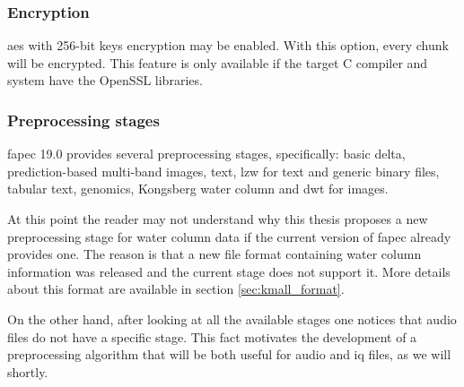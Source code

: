 \subsubsection{Encryption}
\acrshort{aes} with 256-bit keys encryption may be enabled. With this option, every chunk will be encrypted. This feature is only available if the target C compiler and system have the OpenSSL libraries.

\subsubsection{Preprocessing stages}
\acrshort{fapec} 19.0 provides several preprocessing stages, specifically: basic delta, prediction-based multi-band images, text, \acrshort{lzw} for text and generic binary files, tabular text, genomics, Kongsberg water column and \acrshort{dwt} for images.

At this point the reader may not understand why this thesis proposes a new preprocessing stage for water column data if the current version of \acrshort{fapec} already provides one. The reason is that a new file format containing water column information was released and the current stage does not support it. More details about this format are available in section \ref{sec:kmall_format}.

On the other hand, after looking at all the available stages one notices that audio files do not have a specific stage. This fact motivates the development of a preprocessing algorithm that will be both useful for audio and \acrshort{iq} files, as we will shortly.
